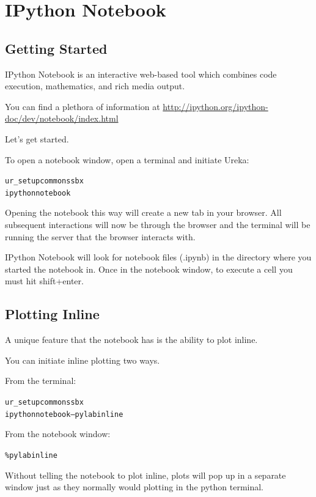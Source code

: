 \chapter{IPython Notebook}
\label{ch:notebook}

\section{Getting Started}

IPython Notebook is an interactive web-based tool which combines code execution, mathematics, and rich media output.

You can find a plethora of information at \url{http://ipython.org/ipython-doc/dev/notebook/index.html}

Let's get started.

To open a notebook window, open a terminal and initiate Ureka:

\begin{alltt}
\termtab ur_setup common ssbx
\termtab ipython notebook
\end{alltt}

Opening the notebook this way will create a new tab in your browser. All subsequent interactions will now
be through the browser and the terminal will be running the server that the browser interacts with.

IPython Notebook will look for notebook files (.ipynb) in the directory where you started the notebook in.
Once in the notebook window, to execute a cell you must hit shift+enter.

\section{Plotting Inline}

A unique feature that the notebook has is the ability to plot inline.

You can initiate inline plotting two ways.

From the terminal:
\begin{alltt}
\termtab ur_setup common ssbx
\termtab ipython notebook --pylab inline
\end{alltt}

From the notebook window:
\begin{alltt}
\pytab \%pylab inline
\end{alltt}

Without telling the notebook to plot inline, plots will pop up in a separate window just as they normally
would plotting in the python terminal.

